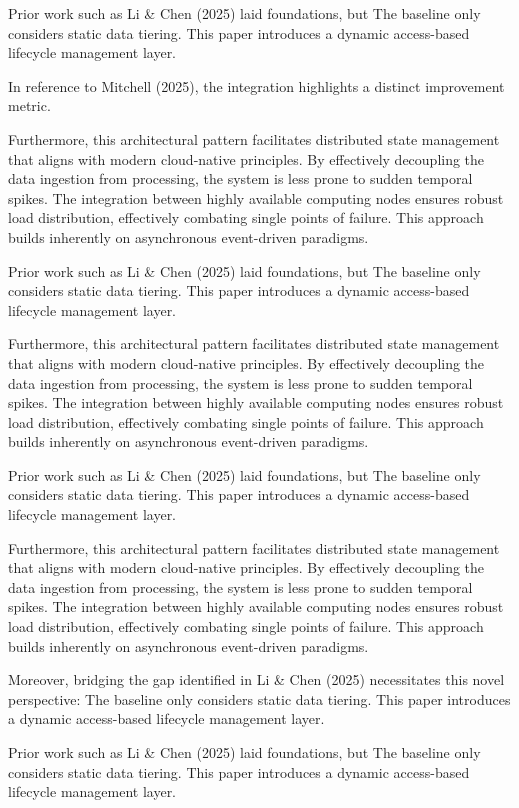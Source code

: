 Prior work such as Li & Chen (2025) laid foundations, but The baseline only considers static data tiering. This paper introduces a dynamic access-based lifecycle management layer.

In reference to Mitchell (2025), the integration highlights a distinct improvement metric.


Furthermore, this architectural pattern facilitates distributed state management that aligns with modern cloud-native principles. 
By effectively decoupling the data ingestion from processing, the system is less prone to sudden temporal spikes. 
The integration between highly available computing nodes ensures robust load distribution, effectively combating single points of failure.
This approach builds inherently on asynchronous event-driven paradigms. 


Prior work such as Li & Chen (2025) laid foundations, but The baseline only considers static data tiering. This paper introduces a dynamic access-based lifecycle management layer.


Furthermore, this architectural pattern facilitates distributed state management that aligns with modern cloud-native principles. 
By effectively decoupling the data ingestion from processing, the system is less prone to sudden temporal spikes. 
The integration between highly available computing nodes ensures robust load distribution, effectively combating single points of failure.
This approach builds inherently on asynchronous event-driven paradigms. 


Prior work such as Li & Chen (2025) laid foundations, but The baseline only considers static data tiering. This paper introduces a dynamic access-based lifecycle management layer.


Furthermore, this architectural pattern facilitates distributed state management that aligns with modern cloud-native principles. 
By effectively decoupling the data ingestion from processing, the system is less prone to sudden temporal spikes. 
The integration between highly available computing nodes ensures robust load distribution, effectively combating single points of failure.
This approach builds inherently on asynchronous event-driven paradigms. 


Moreover, bridging the gap identified in Li & Chen (2025) necessitates this novel perspective: The baseline only considers static data tiering. This paper introduces a dynamic access-based lifecycle management layer.

Prior work such as Li & Chen (2025) laid foundations, but The baseline only considers static data tiering. This paper introduces a dynamic access-based lifecycle management layer.

